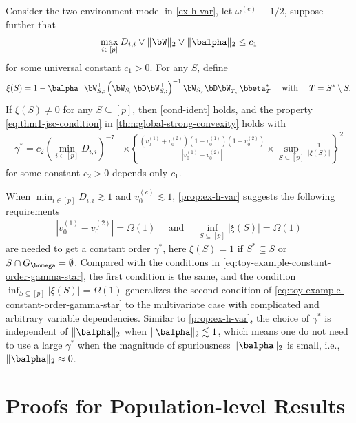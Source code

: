 \documentclass[10pt]{article}
\numberwithin{equation}{section}
\begin{document}
\begin{proposition} 
\label{prop:ex-h-var}
Consider the two-environment model in \cref{ex-h-var}, let $\omega^{(e)}\equiv 1/2$, suppose further that \begin{align}
\label{eq:ex2-req1}
	\max_{i\in [p]} D_{i,i} \lor \|\bW\|_2 \lor \|\balpha\|_2 \le c_1	
\end{align} for some universal constant $c_1>0$. For any $S$, define
\begin{align*}
\xi(S) = 1 - \balpha^\top \bW_{S,:}^\top \left(\bW_{S,:} \bD \bW_{S,:}^\top \right)^{-1} \bW_{S,:} \bD \bW_{T,:}^\top \bbeta_T^* ~~~~ \text{with} ~~~~T=S^*\setminus S.
\end{align*} If $\xi(S) \neq 0$ for any $S \subseteq [p]$, then \cref{cond-ident} holds, and the property \eqref{eq:thm1-jsc-condition} in \cref{thm:global-strong-convexity} holds with
\begin{align}
\label{eq:ex2-cond}
	\gamma^* = c_2 \left(\min_{i\in [p]} D_{i,i}\right)^{-7} &\times \left\{\frac{(v_0^{(1)} + v_0^{(2)})(1 + v_0^{(1)})(1 + v_0^{(2)})}{|v_0^{(1)} - v_0^{(2)}|} \times \sup_{S \subseteq [p]} \frac{1}{\left|\xi(S)\right|}\right\}^2
\end{align} for some constant $c_2>0$ depends only $c_1$.
\end{proposition}

When $\min_{i\in [p]} D_{i,i} \gtrsim 1$ and $v_0^{(e)} \lesssim 1$, \cref{prop:ex-h-var} suggests the following requirements 
\begin{align*}
	| v_0^{(1)} - v_0^{(2)} | = \Omega(1) ~~~~~~ \text{and} ~~~~~~ \inf_{S\subseteq [p]} |\xi(S)| = \Omega(1)
\end{align*} are needed to get a constant order $\gamma^*$, here $\xi(S)=1$ if $S^* \subseteq S$ or $S\cap G_{\bomega} = \emptyset$. Compared with the conditions in \eqref{eq:toy-example-constant-order-gamma-star}, the first condition is the same, and the condition $\inf_{S\subseteq [p]} |\xi(S)| = \Omega(1)$ generalizes the second condition of \eqref{eq:toy-example-constant-order-gamma-star} to the multivariate case with complicated and arbitrary variable dependencies. Similar to \cref{prop:ex-h-var}, the choice of $\gamma^*$ is independent of $\|\balpha\|_2$ when $\|\balpha\|_2 \lesssim 1$, which means one do not need to use a large $\gamma^*$ when the magnitude of spuriousness $\|\balpha\|_2$ is small, i.e., $\|\balpha\|_2 \approx 0$. 


\section{Proofs for Population-level Results}
\label{sec:proof-population}
\end{document}
